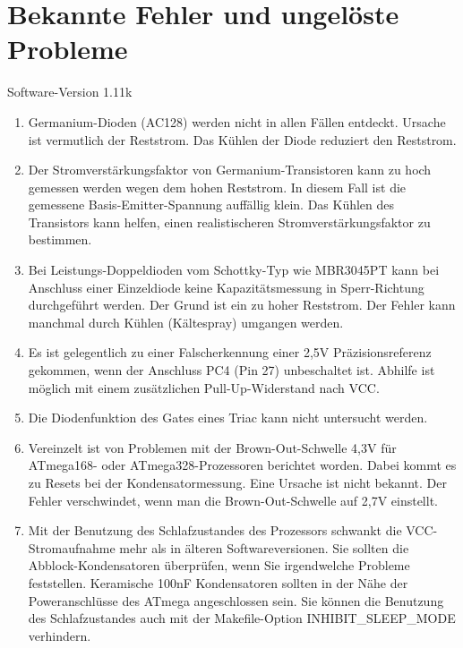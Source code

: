 
\chapter{Bekannte Fehler und ungelöste Probleme}
{\center Software-Version 1.11k}

\begin{enumerate}

\item Germanium-Dioden (AC128) werden nicht in allen Fällen entdeckt. Ursache ist vermutlich der Reststrom.
Das Kühlen der Diode reduziert den Reststrom.

\item Der Stromverstärkungsfaktor von Germanium-Transistoren kann zu hoch gemessen werden wegen dem hohen Reststrom.
In diesem Fall ist die gemessene Basis-Emitter-Spannung auffällig klein.
Das Kühlen des Transistors kann helfen, einen realistischeren Stromverstärkungsfaktor zu bestimmen.

\item Bei Leistungs-Doppeldioden vom Schottky-Typ wie MBR3045PT kann bei Anschluss einer Einzeldiode keine Kapazitätsmessung in Sperr-Richtung 
durchgeführt werden. Der Grund ist ein zu hoher Reststrom. Der Fehler kann manchmal durch Kühlen (Kältespray) umgangen werden.

\item Es ist gelegentlich zu einer Falscherkennung einer 2,5V Präzisionsreferenz gekommen, wenn der Anschluss PC4 (Pin 27) unbeschaltet ist.
Abhilfe ist möglich mit einem zusätzlichen Pull-Up-Widerstand nach VCC.

\item Die Diodenfunktion des Gates eines Triac kann nicht untersucht werden.

\item Vereinzelt ist von Problemen mit der Brown-Out-Schwelle 4,3V für ATmega168- oder ATmega328-Prozessoren berichtet worden.
Dabei kommt es zu Resets bei der Kondensatormessung. Eine Ursache ist nicht bekannt.
Der Fehler verschwindet, wenn man die Brown-Out-Schwelle auf 2,7V einstellt.

\item Mit der Benutzung des Schlafzustandes des Prozessors schwankt die VCC-Stromaufnahme mehr als
in älteren Softwareversionen.
Sie sollten die Abblock-Kondensatoren überprüfen, wenn Sie irgendwelche Probleme feststellen.
Keramische 100nF Kondensatoren sollten in der Nähe der Poweranschlüsse des ATmega angeschlossen sein.
Sie können die Benutzung des Schlafzustandes auch mit der Makefile-Option INHIBIT\_SLEEP\_MODE verhindern.


\end{enumerate}
